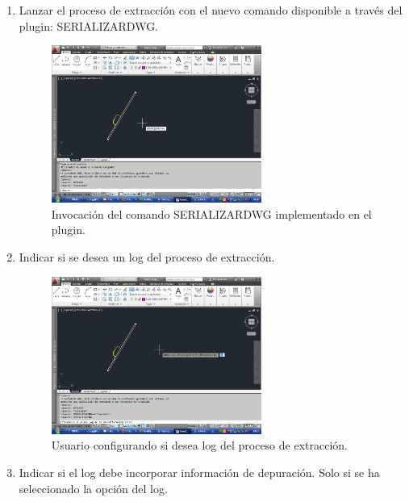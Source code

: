 \begin{enumerate}
\item{Lanzar el proceso de extracción con el nuevo comando disponible a través del plugin: SERIALIZARDWG.}

\begin{figure}[H]
\begin{center}
\includegraphics[width=0.65\textwidth]{imgs/autocad5}
\caption{Invocación del comando SERIALIZARDWG implementado en el plugin.}
\end{center}
\end{figure}

\item{Indicar si se desea un log del proceso de extracción.}

\begin{figure}[H]
\begin{center}
\includegraphics[width=0.65\textwidth]{imgs/autocad6}
\caption{Usuario configurando si desea log del proceso de extracción.}
\end{center}
\end{figure}

\item{Indicar si el log debe incorporar información de depuración. Solo si se ha seleccionado la opción del log.}


\end{enumerate}
